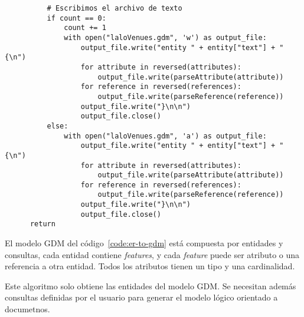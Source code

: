 \begin{code}
\begin{verbatim}
          # Escribimos el archivo de texto
          if count == 0:
              count += 1
              with open("laloVenues.gdm", 'w') as output_file:
                  output_file.write("entity " + entity["text"] + " {\n")
                  for attribute in reversed(attributes):
                      output_file.write(parseAttribute(attribute))
                  for reference in reversed(references):
                      output_file.write(parseReference(reference))
                  output_file.write("}\n\n")
                  output_file.close()
          else:
              with open("laloVenues.gdm", 'a') as output_file:
                  output_file.write("entity " + entity["text"] + " {\n")
                  for attribute in reversed(attributes):
                      output_file.write(parseAttribute(attribute))
                  for reference in reversed(references):
                      output_file.write(parseReference(reference))
                  output_file.write("}\n\n")
                  output_file.close()
      return
    \end{verbatim}
\end{code}



El modelo GDM del código~\ref{code:er-to-gdm} está compuesta por entidades y consultas, cada entidad contiene \textit{features}, y cada \textit{feature} puede ser atributo o una referencia a otra entidad. Todos los atributos tienen un tipo y una cardinalidad.


Este algoritmo solo obtiene las entidades del modelo GDM. Se necesitan además consultas definidas por el usuario para generar el modelo lógico orientado a documetnos.